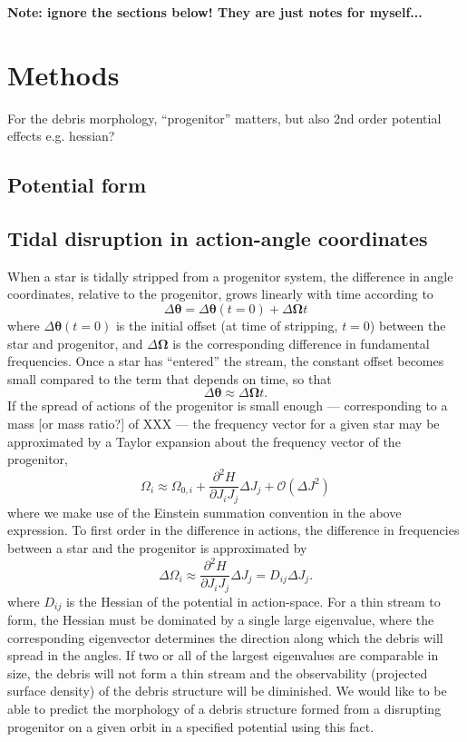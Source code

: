 \documentclass[letterpaper,12pt,preprint]{aastex}
\newcommand{\bs}[1]{\boldsymbol{#1}}
\begin{document}
{\bf Note: ignore the sections below! They are just notes for myself...}

\section{Methods}\label{sec:methods}

For the debris morphology, ``progenitor'' matters, but also 2nd order potential effects e.g. hessian?

\subsection{Potential form}

\subsection{Tidal disruption in action-angle coordinates}
When a star is tidally stripped from a progenitor system, the difference in angle coordinates, relative to the progenitor, grows linearly with time according to
\begin{equation}
	\Delta\bs{\theta} = \Delta\bs{\theta}(t=0) + \Delta\bs{\Omega}t
\end{equation}
where $\Delta\bs{\theta}(t=0)$ is the initial offset (at time of stripping, $t=0$) between the star and progenitor, and $\Delta\bs{\Omega}$ is the corresponding difference in fundamental frequencies. Once a star has ``entered'' the stream, the constant offset becomes small compared to the term that depends on time, so that
\begin{equation}
	\Delta\bs{\theta} \approx \Delta\bs{\Omega}t.
\end{equation}
If the spread of actions of the progenitor is small enough --- corresponding to a mass [or mass ratio?] of XXX --- the frequency vector for a given star may be approximated by a Taylor expansion about the frequency vector of the progenitor,
\begin{equation}
	\Omega_i \approx \Omega_{0,i} + \frac{\partial^2 H}{\partial J_i J_j}\Delta J_j + \mathcal{O}(\Delta J^2)
\end{equation}
where we make use of the Einstein summation convention in the above expression. To first order in the difference in actions, the difference in frequencies between a star and the progenitor is approximated by
\begin{equation}
	\Delta\Omega_i \approx \frac{\partial^2 H}{\partial J_i J_j}\Delta J_j = D_{ij}\Delta J_j.\label{eq:deltafreq}
\end{equation}
where $D_{ij}$ is the Hessian of the potential in action-space. For a thin stream to form, the Hessian must be dominated by a single large eigenvalue, where the corresponding eigenvector determines the direction along which the debris will spread in the angles. If two or all of the largest eigenvalues are comparable in size, the debris will not form a thin stream and the observability (projected surface density) of the debris structure will be diminished. We would like to be able to predict the morphology of a debris structure formed from a disrupting progenitor on a given orbit in a specified potential using this fact.
\end{document}
